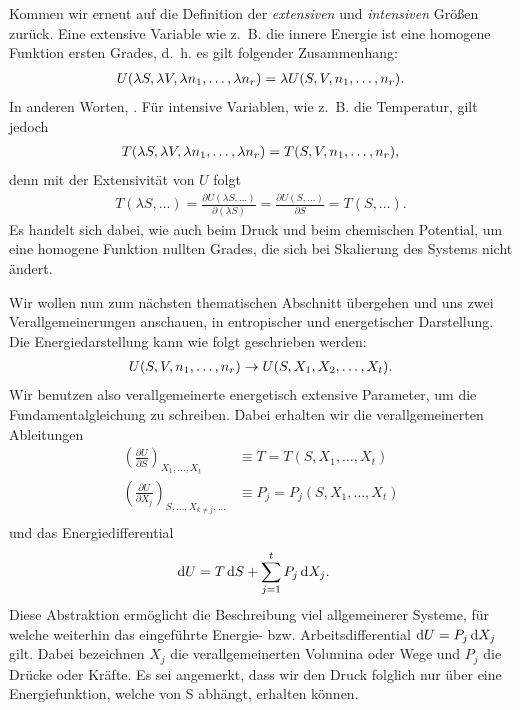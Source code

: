 Kommen wir erneut auf die Definition der \emph{extensiven} und \emph{intensiven} Größen zurück. Eine extensive Variable wie z.~B. die innere Energie ist eine homogene Funktion ersten Grades, d.~h. es gilt folgender Zusammenhang:
\begin{align*}
    U(\lambda S,\lambda V,\lambda n_1,\ldots,\lambda n_r) = \lambda U(S,V,n_1,\ldots,n_r).
\end{align*}
In anderen Worten, .
Für intensive Variablen, wie z.~B. die Temperatur, gilt jedoch
\begin{align*}
    T(\lambda S,\lambda V,\lambda n_1,\ldots,\lambda n_r)=T(S,V,n_1,\ldots,n_r),
\end{align*}
denn mit der Extensivität von $U$ folgt
\begin{align*}
    T(\lambda S,\ldots) = \frac{\partial U(\lambda S,\ldots)}{\partial(\lambda S)}=\frac{\partial U(S,\ldots)}{\partial S}=T(S,\ldots).
\end{align*}
Es handelt sich dabei, wie auch beim Druck und beim chemischen Potential, um eine homogene Funktion nullten Grades, die sich bei Skalierung des Systems nicht ändert.

Wir wollen nun zum nächsten thematischen Abschnitt übergehen und uns zwei Verallgemeinerungen anschauen, in entropischer und energetischer Darstellung.
Die Energiedarstellung kann wie folgt geschrieben werden:
\begin{align*}
    U(S,V,n_1,\ldots,n_r) \rightarrow U(S,X_1,X_2,\ldots,X_t).
\end{align*}
Wir benutzen also verallgemeinerte energetisch extensive Parameter, um die Fundamentalgleichung zu schreiben. Dabei erhalten wir die verallgemeinerten Ableitungen 
\begin{align*}
    \left(\frac{\partial U}{\partial S}\right)_{X_1,\ldots,X_t}                & \equiv T = T(S,X_1,\ldots,X_t)             \\
    \left(\frac{\partial U}{\partial X_j}\right)_{S,\ldots,X_{k\neq j},\ldots} & \equiv P_j = P_j(S,X_1,\ldots,X_t)         \\
\end{align*}
und das Energiedifferential
\begin{align}
    \label{eq:energetische_fundamentalgleichung}
    \mathop{}\!\mathrm{d} U  & = T\mathop{}\!\mathrm{d} S + \sum_{j=1}^tP_j\mathop{}\!\mathrm{d} X_j.
\end{align}
Diese Abstraktion ermöglicht die Beschreibung viel allgemeinerer Systeme, für welche weiterhin das eingeführte Energie- bzw. Arbeitsdifferential $\mathop{}\!\mathrm{d} U = P_j\mathop{}\!\mathrm{d} X_j$ gilt.
Dabei bezeichnen $X_j$ die verallgemeinerten Volumina oder Wege und $P_j$ die Drücke oder Kräfte.
Es sei angemerkt, dass wir den Druck folglich nur über eine Energiefunktion, welche von S abhängt, erhalten können.

